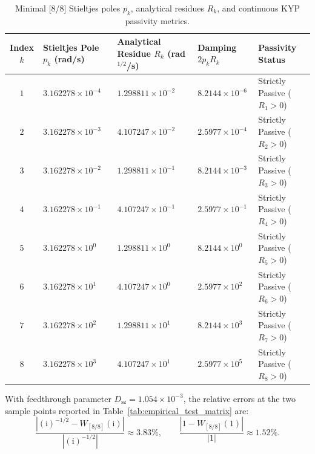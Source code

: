 \documentclass[11pt,a4paper,reqno]{article}
\theoremstyle{plain}
\theoremstyle{definition}
\theoremstyle{remark}
\numberwithin{equation}{section}
\begin{document}
\begin{table}[htbp]
\centering
\caption{Minimal [8/8] Stieltjes poles $p_k$, analytical residues $R_k$, and continuous KYP passivity metrics.}
\label{tab:stieltjes_poles_master}
\vspace{0.4em}
\small
\setlength{\tabcolsep}{6pt}
\begin{tabularx}{\textwidth}{@{}cYYYY@{}}
\toprule
Index $k$ & Stieltjes Pole $p_k$ (rad/s) & Analytical Residue $R_k$ (rad$^{1/2}$/s) & Damping $2 p_k R_k$ & Passivity Status \\
\midrule
$1$ & $3.162278 \times 10^{-4}$ & $1.298811 \times 10^{-2}$ & $8.2144 \times 10^{-6}$ & Strictly Passive ($R_1 > 0$) \\
$2$ & $3.162278 \times 10^{-3}$ & $4.107247 \times 10^{-2}$ & $2.5977 \times 10^{-4}$ & Strictly Passive ($R_2 > 0$) \\
$3$ & $3.162278 \times 10^{-2}$ & $1.298811 \times 10^{-1}$ & $8.2144 \times 10^{-3}$ & Strictly Passive ($R_3 > 0$) \\
$4$ & $3.162278 \times 10^{-1}$ & $4.107247 \times 10^{-1}$ & $2.5977 \times 10^{-1}$ & Strictly Passive ($R_4 > 0$) \\
$5$ & $3.162278 \times 10^{0}$  & $1.298811 \times 10^{0}$  & $8.2144 \times 10^{0}$ & Strictly Passive ($R_5 > 0$) \\
$6$ & $3.162278 \times 10^{1}$  & $4.107247 \times 10^{0}$  & $2.5977 \times 10^{2}$ & Strictly Passive ($R_6 > 0$) \\
$7$ & $3.162278 \times 10^{2}$  & $1.298811 \times 10^{1}$  & $8.2144 \times 10^{3}$ & Strictly Passive ($R_7 > 0$) \\
$8$ & $3.162278 \times 10^{3}$  & $4.107247 \times 10^{1}$  & $2.5977 \times 10^{5}$ & Strictly Passive ($R_8 > 0$) \\
\bottomrule
\end{tabularx}
\end{table}

With feedthrough parameter $D_{\mathrm{sz}} = 1.054 \times 10^{-3}$, the relative errors at the two sample points reported in Table~\ref{tab:empirical_test_matrix} are:
\begin{equation}
  \frac{|(\mathrm{i})^{-1/2} - W_{[8/8]}(\mathrm{i})|}{|(\mathrm{i})^{-1/2}|} \approx 3.83\%, \qquad
  \frac{|1 - W_{[8/8]}(1)|}{|1|} \approx 1.52\%.
\end{equation}
\end{document}
